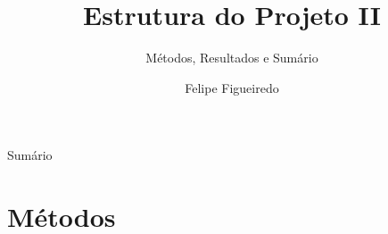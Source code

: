 \documentclass{beamer}
\title%
{Estrutura do Projeto II}
\subtitle
{Métodos, Resultados e Sumário} %
\author%
{Felipe Figueiredo}%
\institute[INTO] %
{Instituto Nacional de Traumatologia e Ortopedia
}
\date%
{}
\begin{document}
\begin{frame}
  \titlepage
\end{frame}

\begin{frame}{Sumário}
  \tableofcontents
\end{frame}








\section{Métodos}
\end{document}
